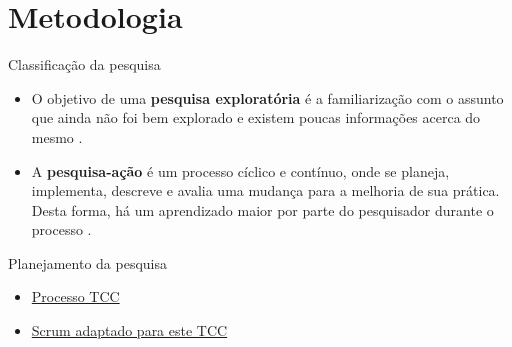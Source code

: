 \section{Metodologia}

\begin{frame}{Classificação da pesquisa}
\begin{itemize}
\item O objetivo de uma \textbf{pesquisa exploratória} é a familiarização com o assunto que ainda não foi bem explorado e existem poucas informações acerca do mesmo \cite{gil}.
\linebreak
\item A \textbf{pesquisa-ação} é um processo cíclico e contínuo, onde se planeja, implementa, descreve e avalia uma mudança para a melhoria de sua prática. Desta forma, há um aprendizado maior por parte do pesquisador durante o processo \cite{ramon}.
\end{itemize}
\end{frame}
\begin{frame}{Planejamento da pesquisa}
\begin{itemize}
\item \href{run:./figuras/Processo_TCC.pdf}{Processo TCC}
\linebreak
\linebreak
\item \href{run:./figuras/scrum_adaptado.pdf}{Scrum adaptado para este TCC}
\end{itemize}

\end{frame}
